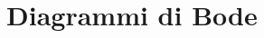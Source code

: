 \documentclass[../main.tex]{subfiles}
\begin{document}
\clearpage
\thispagestyle{empty}
\vspace*{7cm}
\section{Diagrammi di Bode}
\vspace*{1.5cm}
\end{document}
